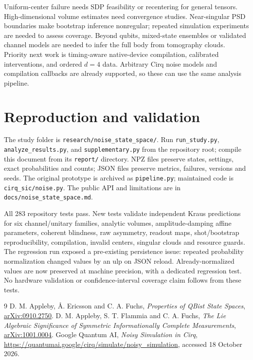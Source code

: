 \documentclass[11pt]{article}
\begin{document}
Uniform-center failure needs SDP feasibility or recentering for general tensors.
High-dimensional volume estimates need convergence studies. Near-singular PSD
boundaries make bootstrap inference nonregular; repeated simulation experiments
are needed to assess coverage. Beyond qubits, mixed-state ensembles or validated
channel models are needed to infer the full body from tomography clouds.
Priority next work is timing-aware native-device compilation, calibrated
interventions, and ordered $d=4$ data. Arbitrary Cirq noise models and compilation
callbacks are already supported, so these can use the same analysis pipeline.

\appendix
\section{Reproduction and validation}
The study folder is \texttt{research/noise\_state\_space/}. Run
\texttt{run\_study.py}, \texttt{analyze\_results.py}, and \texttt{supplementary.py}
from the repository root; compile this document from its \texttt{report/}
directory. NPZ files preserve states, settings, exact probabilities and counts;
JSON files preserve metrics, failures, versions and seeds. The original prototype
is archived as \texttt{pipeline.py}; maintained code is \texttt{cirq\_sic/noise.py}.
The public API and limitations are in \texttt{docs/noise\_state\_space.md}.

All 283 repository tests pass. New tests validate independent Kraus predictions
for six channel/unitary families, analytic volumes, amplitude-damping affine
parameters, coherent blindness, raw asymmetry, readout maps, shot/bootstrap
reproducibility, compilation, invalid centers, singular clouds and resource guards.
The regression run exposed a pre-existing persistence issue: repeated probability
normalization changed values by an ulp on JSON reload. Already-normalized values
are now preserved at machine precision, with a dedicated regression test.
No hardware validation or confidence-interval coverage claim follows from these tests.

\begin{thebibliography}{9}
 D. M. Appleby, \AA. Ericsson and C. A. Fuchs,
\emph{Properties of QBist State Spaces},
\href{https://arxiv.org/abs/0910.2750}{arXiv:0910.2750}.
 D. M. Appleby, S. T. Flammia and C. A. Fuchs,
\emph{The Lie Algebraic Significance of Symmetric Informationally Complete Measurements},
\href{https://arxiv.org/abs/1001.0004}{arXiv:1001.0004}.
 Google Quantum AI, \emph{Noisy Simulation in Cirq},
\url{https://quantumai.google/cirq/simulate/noisy_simulation}, accessed 18 October 2026.
\end{thebibliography}
\end{document}

